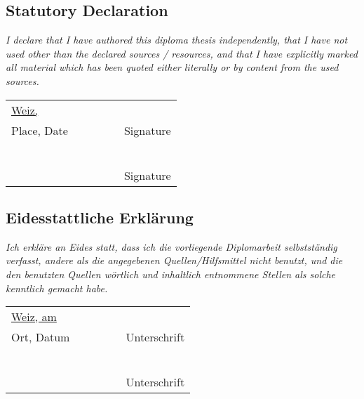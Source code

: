 \null
\vspace{2cm}

\subsection*{Statutory Declaration}
\noindent
{\it
    I declare that I have authored this diploma thesis independently, that I have
    not used other than the declared sources / resources, and that I have
    explicitly marked all material which has been quoted either literally
    or by content from the used sources.
}
\vspace{1cm}

\begin{flushleft}
    \begin{tabular}{lclcl}
        \underline{Weiz, \hspace*{4cm}} &~\hfill & \hspace*{2.5cm} &~\hfill & \underline{\hspace*{5cm}} \\
        \multicolumn{1}{c}{Place, Date} &~&   &~&  \multicolumn{1}{c}{Signature} \\
        \vspace{0.5cm} \\
        \hfill &~&   &~& \underline{\hspace*{5cm}} \\
        \hfill &~&   &~& \multicolumn{1}{c}{Signature} \\
    \end{tabular}
\end{flushleft}
\vspace{3cm}

\subsection*{Eidesstattliche Erkl{\"a}rung}
\noindent
{\it
    Ich erkl{\"a}re an Eides statt, dass ich die vorliegende Diplomarbeit
    selbstst{\"a}ndig verfasst, andere als die angegebenen Quellen/Hilfsmittel
    nicht benutzt, und die den benutzten Quellen w{\"o}rtlich und inhaltlich
    entnommene Stellen als solche kenntlich gemacht habe.
}
\vspace{1cm}

\begin{flushleft}
    \begin{tabular}{lclcl}
        \underline{Weiz, am\hspace*{3.6cm}} &~\hfill & \hspace*{2.5cm} &~\hfill &  \underline{\hspace*{5cm}} \\
        \multicolumn{1}{c}{Ort, Datum}  &~&   &~&  \multicolumn{1}{c}{Unterschrift} \\
        \vspace{0.5cm} \\
        \hfill &~&   &~& \underline{\hspace*{5cm}} \\
        \hfill &~&   &~& \multicolumn{1}{c}{Unterschrift} \\
    \end{tabular}
\end{flushleft}